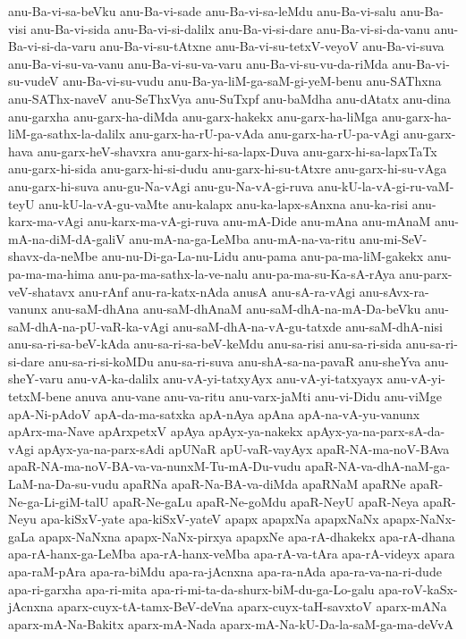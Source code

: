 {anu-Ba-vi-sa-beVku
anu-Ba-vi-sade
anu-Ba-vi-sa-leMdu
anu-Ba-vi-salu
anu-Ba-visi
anu-Ba-vi-sida
anu-Ba-vi-si-dalilx
anu-Ba-vi-si-dare
anu-Ba-vi-si-da-vanu
anu-Ba-vi-si-da-varu
anu-Ba-vi-su-tAtxne
anu-Ba-vi-su-tetxV-veyoV
anu-Ba-vi-suva
anu-Ba-vi-su-va-vanu
anu-Ba-vi-su-va-varu
anu-Ba-vi-su-vu-da-riMda
anu-Ba-vi-su-vudeV
anu-Ba-vi-su-vudu
anu-Ba-ya-liM-ga-saM-gi-yeM-benu
anu-SAThxna
anu-SAThx-naveV
anu-SeThxVya
anu-SuTxpf
anu-baMdha
anu-dAtatx
anu-dina
anu-garxha
anu-garx-ha-diMda
anu-garx-hakekx
anu-garx-ha-liMga
anu-garx-ha-liM-ga-sathx-la-dalilx
anu-garx-ha-rU-pa-vAda
anu-garx-ha-rU-pa-vAgi
anu-garx-hava
anu-garx-heV-shavxra
anu-garx-hi-sa-lapx-Duva
anu-garx-hi-sa-lapxTaTx
anu-garx-hi-sida
anu-garx-hi-si-dudu
anu-garx-hi-su-tAtxre
anu-garx-hi-su-vAga
anu-garx-hi-suva
anu-gu-Na-vAgi
anu-gu-Na-vA-gi-ruva
anu-kU-la-vA-gi-ru-vaM-teyU
anu-kU-la-vA-gu-vaMte
anu-kalapx
anu-ka-lapx-sAnxna
anu-ka-risi
anu-karx-ma-vAgi
anu-karx-ma-vA-gi-ruva
anu-mA-Dide
anu-mAna
anu-mAnaM
anu-mA-na-diM-dA-galiV
anu-mA-na-ga-LeMba
anu-mA-na-va-ritu
anu-mi-SeV-shavx-da-neMbe
anu-nu-Di-ga-La-nu-Lidu
anu-pama
anu-pa-ma-liM-gakekx
anu-pa-ma-ma-hima
anu-pa-ma-sathx-la-ve-nalu
anu-pa-ma-su-Ka-sA-rAya
anu-parx-veV-shatavx
anu-rAnf
anu-ra-katx-nAda
anusA
anu-sA-ra-vAgi
anu-sAvx-ra-vanunx
anu-saM-dhAna
anu-saM-dhAnaM
anu-saM-dhA-na-mA-Da-beVku
anu-saM-dhA-na-pU-vaR-ka-vAgi
anu-saM-dhA-na-vA-gu-tatxde
anu-saM-dhA-nisi
anu-sa-ri-sa-beV-kAda
anu-sa-ri-sa-beV-keMdu
anu-sa-risi
anu-sa-ri-sida
anu-sa-ri-si-dare
anu-sa-ri-si-koMDu
anu-sa-ri-suva
anu-shA-sa-na-pavaR
anu-sheYva
anu-sheY-varu
anu-vA-ka-dalilx
anu-vA-yi-tatxyAyx
anu-vA-yi-tatxyayx
anu-vA-yi-tetxM-bene
anuva
anu-vane
anu-va-ritu
anu-varx-jaMti
anu-vi-Didu
anu-viMge
apA-Ni-pAdoV
apA-da-ma-satxka
apA-nAya
apAna
apA-na-vA-yu-vanunx
apArx-ma-Nave
apArxpetxV
apAya
apAyx-ya-nakekx
apAyx-ya-na-parx-sA-da-vAgi
apAyx-ya-na-parx-sAdi
apUNaR
apU-vaR-vayAyx
apaR-NA-ma-noV-BAva
apaR-NA-ma-noV-BA-va-va-nunxM-Tu-mA-Du-vudu
apaR-NA-va-dhA-naM-ga-LaM-na-Da-su-vudu
apaRNa
apaR-Na-BA-va-diMda
apaRNaM
apaRNe
apaR-Ne-ga-Li-giM-talU
apaR-Ne-gaLu
apaR-Ne-goMdu
apaR-NeyU
apaR-Neya
apaR-Neyu
apa-kiSxV-yate
apa-kiSxV-yateV
apapx
apapxNa
apapxNaNx
apapx-NaNx-gaLa
apapx-NaNxna
apapx-NaNx-pirxya
apapxNe
apa-rA-dhakekx
apa-rA-dhana
apa-rA-hanx-ga-LeMba
apa-rA-hanx-veMba
apa-rA-va-tAra
apa-rA-videyx
apara
apa-raM-pAra
apa-ra-biMdu
apa-ra-jAcnxna
apa-ra-nAda
apa-ra-va-na-ri-dude
apa-ri-garxha
apa-ri-mita
apa-ri-mi-ta-da-shurx-biM-du-ga-Lo-galu
apa-roV-kaSx-jAcnxna
aparx-cuyx-tA-tamx-BeV-deVna
aparx-cuyx-taH-savxtoV
aparx-mANa
aparx-mA-Na-Bakitx
aparx-mA-Nada
aparx-mA-Na-kU-Da-la-saM-ga-ma-deVvA
}
